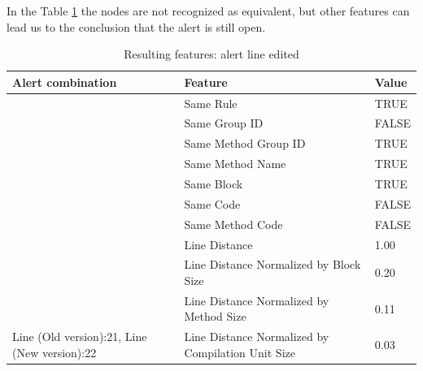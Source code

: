 \documentclass[
]{article}
\begin{document}
\newpage

In the Table \ref{editing_line} the nodes are not recognized as
equivalent, but other features can lead us to the conclusion that the
alert is still open.

\small

\begin{table}[!h]

\caption{\label{tab:unnamed-chunk-20}Resulting features: alert line edited \label{editing_line} }
\centering
\begin{tabular}[t]{l|l|l}
\hline
Alert combination & Feature & Value\\
\hline
\rowcolor{gray!6}   & Same Rule & TRUE\\

 & Same Group ID & FALSE\\

\rowcolor{gray!6}   & Same Method Group ID & TRUE\\

 & Same Method Name & TRUE\\

\rowcolor{gray!6}   & Same Block & TRUE\\

 & Same Code & FALSE\\

\rowcolor{gray!6}   & Same Method Code & FALSE\\

 & Line Distance & 1.00\\

\rowcolor{gray!6}   & Line Distance Normalized by Block Size & 0.20\\

 & Line Distance Normalized by Method Size & 0.11\\

\multirow[t]{-11}{*}{\raggedright\arraybackslash Line (Old version):21, Line (New version):22} & Line Distance Normalized by Compilation Unit Size & 0.03\\
\hline
\end{tabular}
\end{table}

\normalsize

\newpage
\end{document}
